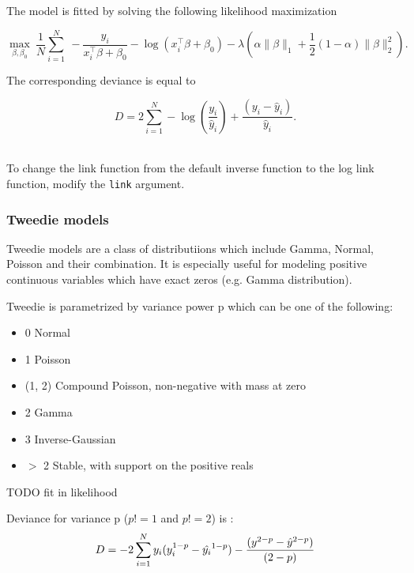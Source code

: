 The model is fitted by solving the following likelihood maximization

$$  \max_{\beta,\beta_0} \  \frac{1}{N}  \sum_{i=1}^N  \ -\frac{y_i}{x_i^{\top}\beta+\beta_0 } - \log(x_i^{\top}\beta + \beta_0) -\lambda \left(  \alpha \| \beta \|_1 + \frac{1}{2}(1-\alpha)\| \beta \|_2^2  \right). $$

The corresponding deviance is equal to

$$D = 2\sum_{i=1}^{N} - \log\left({\frac{ y_i }{\hat{y}_i}}\right) + \frac{(y_i - \hat{y}_i)}{\hat{y}_i}. $$

\waterExampleInR
\\
To change the link function from the default inverse function to the log link function, modify the \texttt{link}
argument.
\bigskip


\waterExampleInPython


\subsubsection{Tweedie models}

Tweedie models are a class of distributiions which include Gamma, Normal, Poisson and their combination. It is especially useful for modeling positive continuous variables which have exact zeros (e.g. Gamma distribution).

Tweedie is parametrized by variance power p which can be one of the following:

\begin{itemize}
\item  0	Normal
\item  1	Poisson
\item (1, 2)	Compound Poisson, non-negative with mass at zero
\item 2	Gamma
\item 3	Inverse-Gaussian
\item $>$ 2	Stable, with support on the positive reals
\end{itemize}


TODO fit in likelihood 

Deviance for variance p ($p != 1$ and $p != 2$) is :
\[
D = -2\sum\limits_{i=1}\limits^{N}{ y_i  (y_i^{1-p} - \hat{y_i}^{1-p}) - {(y^{2 - p} - \hat{y}^{2 - p})\over(2 - p)}}
\]


